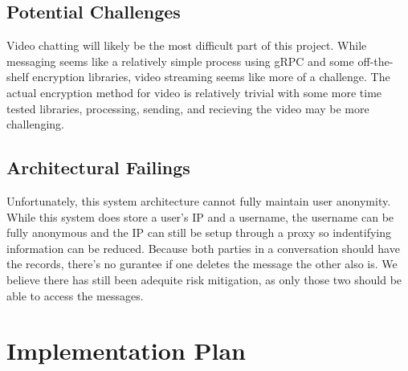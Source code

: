 \documentclass[titlepage]{article}
\begin{document}
    \subsection{Potential Challenges}

    Video chatting will likely be the most difficult part of this project.
    While messaging seems like a relatively simple process using gRPC and some off-the-shelf encryption libraries, video streaming seems like more of a challenge.
    The actual encryption method for video is relatively trivial with some more time tested libraries, processing, sending, and recieving the video may be more challenging.

    \subsection{Architectural Failings}

    Unfortunately, this system architecture cannot fully maintain user anonymity. 
    While this system does store a user's IP and a username, the username can be fully anonymous and the IP can still be setup through a proxy so indentifying information can be reduced.
    Because both parties in a conversation should have the records, there's no gurantee if one deletes the message the other also is. 
    We believe there has still been adequite risk mitigation, as only those two should be able to access the messages.

    \section{Implementation Plan}
\end{document}
